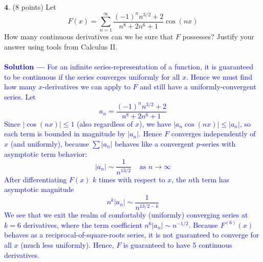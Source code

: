 \documentclass[12pt]{article}
\begin{document}
\noindent $\textbf{4}$. (8 points) Let 
$$F(x) = \sum_{n=1}^\infty \frac{(-1)^n n^{3/2} + 2}{n^8 + 2n^6 + 1} \cos(nx)$$
How many continuous derivatives can we be sure that $F$
possesses? Justify your answer using tools from Calculus II. \\ \\
\textcolor{blue}{\textbf{Solution —} For an infinite series-representation of a function, it is guaranteed to be continuous if the series converges uniformly for all $x$. Hence we must find how many $x$-derivatives we can apply to $F$ and still have a uniformly-convergent series. Let $$a_n = \frac{(-1)^n n^{3/2} + 2}{n^8 + 2n^6 + 1}$$ 
Since $|\cos(nx)| \leq 1$ (also regardless of $x$), we have $|a_n \cos(nx)| \leq |a_n|$, so each term is bounded in magnitude by $|a_n|$. Hence $F$ converges independently of $x$ (and uniformly), because $\sum |a_n|$ behaves like a convergent $p$-series with asymptotic term behavior: $$|a_n| \sim \frac{1}{n^{13/2}} \;\;\;\; \text{as $n \to \infty$}$$
After differentiating $F(x)$ $k$ times with respect to $x$, the $n$th term has asymptotic magnitude $$n^k |a_n| \sim \frac{1}{n^{13/2 - k}}$$ We see that we exit the realm of comfortably (uniformly) converging series at $k=6$ derivatives, where the term coefficient $n^6|a_n| \sim n^{-1/2}$. Because $F^{(6)}(x)$ behaves as a reciprocal-of-square-roots series, it is not guaranteed to converge for all $x$ (much less uniformly). Hence, $F$ is guaranteed to have $\boxed{5}$ continuous derivatives. \\ }
\end{document}
